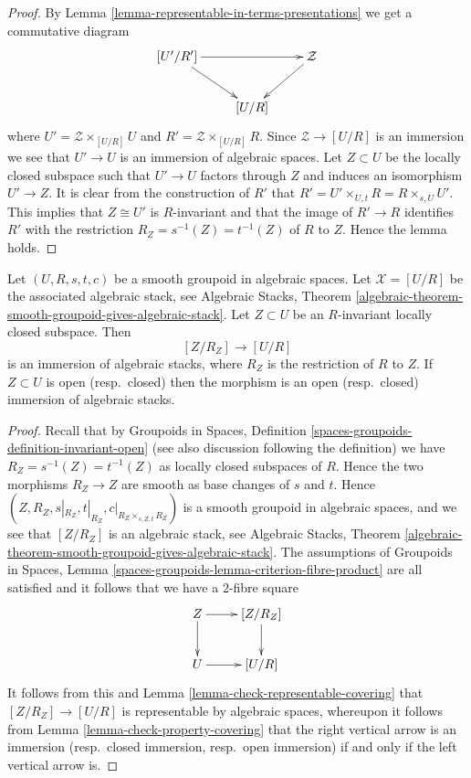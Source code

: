 \begin{proof}
By
Lemma \ref{lemma-representable-in-terms-presentations}
we get a commutative diagram
$$
\xymatrix{
[U'/R'] \ar[dr] \ar[rr] & & \mathcal{Z} \ar[ld] \\
& [U/R]
}
$$
where $U' = \mathcal{Z} \times_{[U/R]} U$ and
$R' = \mathcal{Z} \times_{[U/R]} R$.
Since $\mathcal{Z} \to [U/R]$ is an immersion we see that
$U' \to U$ is an immersion of algebraic spaces. Let $Z \subset U$
be the locally closed subspace such that $U' \to U$ factors through
$Z$ and induces an isomorphism $U' \to Z$.
It is clear from the construction of $R'$ that
$R' = U' \times_{U, t} R = R \times_{s, U} U'$.
This implies that $Z \cong U'$ is $R$-invariant and that the image of
$R' \to R$ identifies $R'$ with the restriction
$R_Z = s^{-1}(Z) = t^{-1}(Z)$ of $R$ to $Z$. Hence the lemma holds.
\end{proof}

\begin{lemma}
\label{lemma-immersion-presentation}
Let $(U, R, s, t, c)$ be a smooth groupoid in algebraic spaces.
Let $\mathcal{X} = [U/R]$ be the associated algebraic stack, see
Algebraic Stacks,
Theorem \ref{algebraic-theorem-smooth-groupoid-gives-algebraic-stack}.
Let $Z \subset U$ be an $R$-invariant locally closed subspace. Then
$$
[Z/R_Z] \longrightarrow [U/R]
$$
is an immersion of algebraic stacks, where $R_Z$ is the restriction
of $R$ to $Z$. If $Z \subset U$ is open (resp.\ closed) then the morphism
is an open (resp.\ closed) immersion of algebraic stacks.
\end{lemma}

\begin{proof}
Recall that by
Groupoids in Spaces,
Definition \ref{spaces-groupoids-definition-invariant-open}
(see also discussion following the definition)
we have $R_Z = s^{-1}(Z) = t^{-1}(Z)$ as locally closed subspaces
of $R$. Hence the two morphisms $R_Z \to Z$ are smooth as base changes
of $s$ and $t$. Hence
$(Z, R_Z, s|_{R_Z}, t|_{R_Z}, c|_{R_Z \times_{s, Z, t} R_Z})$ is
a smooth groupoid in algebraic spaces, and we see that
$[Z/R_Z]$ is an algebraic stack, see
Algebraic Stacks,
Theorem \ref{algebraic-theorem-smooth-groupoid-gives-algebraic-stack}.
The assumptions of
Groupoids in Spaces,
Lemma \ref{spaces-groupoids-lemma-criterion-fibre-product}
are all satisfied and it follows that we have a $2$-fibre square
$$
\xymatrix{
Z \ar[d] \ar[r] & [Z/R_Z] \ar[d] \\
U \ar[r] & [U/R]
}
$$
It follows from this and
Lemma \ref{lemma-check-representable-covering}
that $[Z/R_Z] \to [U/R]$ is representable by algebraic spaces,
whereupon it follows from
Lemma \ref{lemma-check-property-covering}
that the right vertical arrow is an immersion (resp.\ closed immersion,
resp.\ open immersion) if and only if the left vertical arrow is.
\end{proof}

